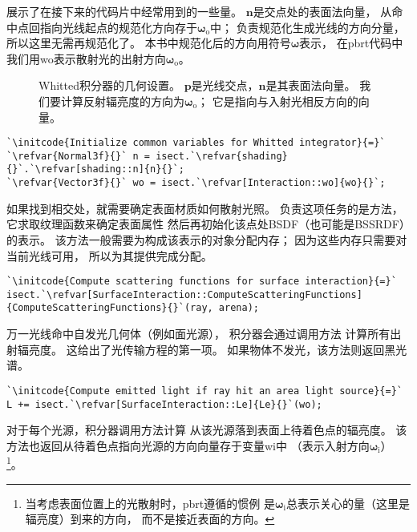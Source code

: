 展示了在接下来的代码片中经常用到的一些量。
$\bm n$是交点处的表面法向量，
从命中点回指向光线起点的规范化方向存于${\bm \omega}_\mathrm{o}$中；
\protect{}负责规范化生成光线的方向分量，
所以这里无需再规范化了。
本书中规范化后的方向用符号$\bm \omega$表示，
在pbrt代码中我们用{\ttfamily wo}表示散射光的出射方向${\bm \omega}_\mathrm{o}$。
\begin{figure}[htbp]
    \centering
    \caption{Whitted积分器的几何设置。
        $\bm p$是光线交点，$\bm n$是其表面法向量。
        我们要计算反射辐亮度的方向为${\bm \omega}_\mathrm{o}$；
        它是指向与入射光相反方向的向量。}
    \label{fig:1.20}
\end{figure}
\begin{lstlisting}
`\initcode{Initialize common variables for Whitted integrator}{=}`
`\refvar{Normal3f}{}` n = isect.`\refvar{shading}{}`.`\refvar[shading::n]{n}{}`;
`\refvar{Vector3f}{}` wo = isect.`\refvar[Interaction::wo]{wo}{}`;
\end{lstlisting}

如果找到相交处，就需要确定表面材质如何散射光照。
负责这项任务的是方法，
它求取纹理函数来确定表面属性
然后再初始化该点处BSDF（也可能是BSSRDF）的表示。
该方法一般需要为构成该表示的对象分配内存；
因为这些内存只需要对当前光线可用，
所以为其提供完成分配。
\begin{lstlisting}
`\initcode{Compute scattering functions for surface interaction}{=}`
isect.`\refvar[SurfaceInteraction::ComputeScatteringFunctions]{ComputeScatteringFunctions}{}`(ray, arena);
\end{lstlisting}

万一光线命中自发光几何体（例如面光源），
积分器会通过调用方法
计算所有出射辐亮度。
这给出了光传输方程的第一项。
如果物体不发光，该方法则返回黑光谱。
\begin{lstlisting}
`\initcode{Compute emitted light if ray hit an area light source}{=}`
L += isect.`\refvar[SurfaceInteraction::Le]{Le}{}`(wo);
\end{lstlisting}

对于每个光源，积分器调用方法计算
从该光源落到表面上待着色点的辐亮度。
该方法也返回从待着色点指向光源的方向向量存于变量{\ttfamily wi}中
（表示入射方向${\bm \omega}_\mathrm{i}$）
\footnote{当考虑表面位置上的光散射时，pbrt遵循的惯例
    是${\bm \omega}_\mathrm{i}$总表示关心的量（这里是辐亮度）到来的方向，
    而不是接近表面的方向。}。


